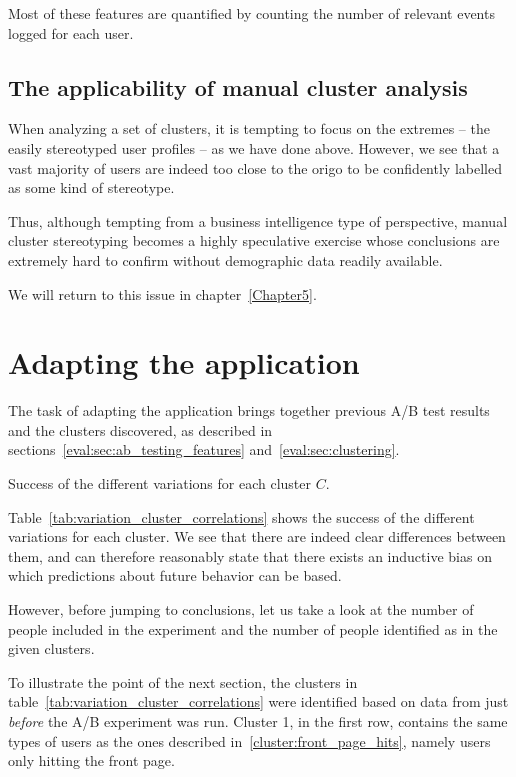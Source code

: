 Most of these features are quantified by counting the number of relevant events logged for each user.

\subsection{The applicability of manual cluster analysis}
\label{eval:sub:cluster_analysis_applicability}

When analyzing a set of clusters, it is tempting to focus on the extremes -- the easily stereotyped user profiles -- as we have done above. However, we see that a vast majority of users are indeed too close to the origo to be confidently labelled as some kind of stereotype.

Thus, although tempting from a business intelligence type of perspective, manual cluster stereotyping becomes a highly speculative exercise whose conclusions are extremely hard to confirm without demographic data readily available.

We will return to this issue in chapter~\ref{Chapter5}.

\section{Adapting the application} %
\label{eval:sec:adapting_the_application}

The task of adapting the application brings together previous A/B test results and the clusters discovered, as described in sections~\ref{eval:sec:ab_testing_features} and~\ref{eval:sec:clustering}.

\begin{table}[h]
  
  \caption{Success of the different variations for each cluster $C$.}
  \label{tab:variation_cluster_correlations}
\end{table}

Table~\ref{tab:variation_cluster_correlations} shows the success of the different variations for each cluster. We see that there are indeed clear differences between them, and can therefore reasonably state that there exists an inductive bias on which predictions about future behavior can be based.

However, before jumping to conclusions, let us take a look at the number of people included in the experiment and the number of people identified as in the given clusters.

To illustrate the point of the next section, the clusters in table~\ref{tab:variation_cluster_correlations} were identified based on data from just \emph{before} the A/B experiment was run. Cluster 1, in the first row, contains the same types of users as the ones described in~\ref{cluster:front_page_hits}, namely users only hitting the front page.

